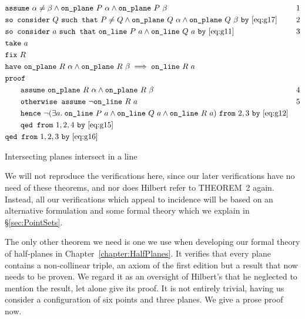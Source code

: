 \begin{boxedfigure}
\small
  \begin{align*}
    &\code{assume}\ \alpha\neq\beta \wedge \code{on\_plane}\ P\ \alpha\wedge\code{on\_plane}\ P\ \beta & 1\\
    &\code{so consider}\ Q\ \code{such that}\ P\neq Q \wedge\code{on\_plane}\ Q\ \alpha \wedge\code{on\_plane}\ Q\ \beta\ \code{by}\ \eqref{eq:g17} & 2\\
    &\code{so consider}\ a\ \code{such that}\ \code{on\_line}\ P\ a\wedge\code{on\_line}\ Q\ a\ \code{by}\ \eqref{eq:g11} & 3\\
    &\code{take}\ a\\
    &\code{fix}\ R\\
    &\code{have}\ \code{on\_plane}\ R\ \alpha\wedge\code{on\_plane}\ R\ \beta \implies \code{on\_line}\ R\ a\\
    &\code{proof}\\
    &\qquad\code{assume}\ \code{on\_plane}\ R\ \alpha\wedge\code{on\_plane}\ R\ \beta & 4\\
    &\qquad\code{otherwise assume}\ \neg\code{on\_line}\ R\ a & 5\\
    &\qquad\code{hence}\ \Triangle{a}{P}{Q}{R}\ \code{from}\ 2,3\ \code{by}\ \eqref{eq:g12}\\
    &\qquad\code{qed from}\ 1,2,4\ \code{by}\ \eqref{eq:g15}\\
    &\code{qed from}\ 1,2,3\ \code{by}\ \eqref{eq:g16}
  \end{align*}
  \caption{Intersecting planes intersect in a line}
  \label{fig:Theorem1}
\end{boxedfigure}

We will not reproduce the verifications here, since our later verifications have no need of these theorems, and nor does Hilbert refer to THEOREM~2 again. Instead, all our verifications which appeal to incidence will be based on an alternative formulation and some formal theory which we explain in \S\ref{sec:PointSets}.

The only other theorem we need is one we use when developing our formal theory of half-planes in Chapter~\ref{chapter:HalfPlanes}. It verifies that every plane contains a non-collinear triple, an axiom of the first edition but a result that now needs to be proven. We regard it as an oversight of Hilbert's that he neglected to mention the result, let alone give its proof. It is not entirely trivial, having us consider a configuration of six points and three planes. We give a prose proof now.


